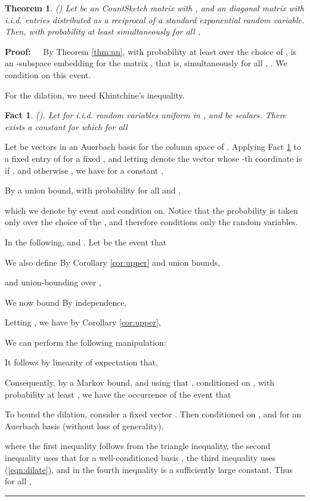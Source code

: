 \documentclass[11pt]{article}
\newtheorem{theorem}{Theorem}
\newenvironment{proof}{\begin{trivlist} \item {\bf Proof:~~}}
  {\qed\end{trivlist}}
\def\qed{\hfill\rule{2mm}{2mm}}
\newtheorem{fact}{Fact}
\begin{document}
\begin{theorem}\label{thm:expWork}(\cite{wz13})
Let  be an  CountSketch matrix with , and  an  diagonal matrix
with i.i.d. entries  distributed as a reciprocal of a standard exponential random variable. 
Then, with probability at least  simultaneously for all ,

\end{theorem}
\begin{proof}
By Theorem \ref{thm:nn}, with probability at least  over the choice of , 
 is an -subspace embedding for the matrix , 
that is, simultaneously for all ,
. We condition  on this event.

For the dilation, we need Khintchine's inequality.
\begin{fact}\label{fact:khintchine}(\cite{h81}). 
Let  for i.i.d. random variables 
uniform in , and  be scalars. 
There exists a constant  for which for all 

\end{fact}
Let  be  vectors in an Auerbach basis for the column
space of . 
Applying Fact \ref{fact:khintchine} to a fixed entry  of  for a
fixed , and letting  denote the vector whose -th coordinate
is  if , and otherwise , 
we have for a constant , 

By a union bound, with probability 
 for all  and ,

which we denote by event  and condition on. 
Notice that the probability is taken only over
the choice of the , and therefore conditions only the  random variables. 

In the following,  and . 
Let  be the event that 

We also
define 
By Corollary \ref{cor:upper} and union bounds,

and union-bounding over , 

We now bound 
By independence, 

Letting , 
we have by Corollary \ref{cor:upper},

We can perform the following manipulation:

It follows by linearity of expectation that,

Consequently, by a Markov bound, and using that , 
conditioned on , with probability at least , we have the
occurrence of the event 
that 

To bound the dilation, consider a fixed vector .
Then conditioned on ,
and for  
an Auerbach basis (without loss of generality),

where the first inequality follows from the triangle inequality,
the second inequality uses that  for a
well-conditioned basis , the third inequality uses 
(\ref{eqn:dilate}), and in the fourth inequality  is a
sufficiently large constant. Thus for all ,



\end{proof}
\end{document}
